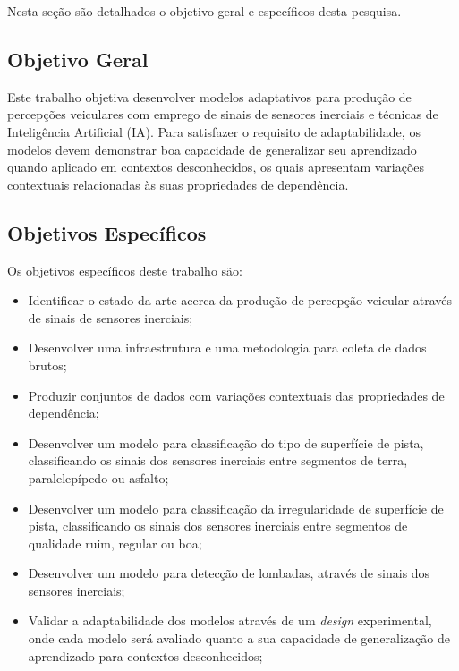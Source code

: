 Nesta seção são detalhados o objetivo geral e específicos desta pesquisa.

\subsection{Objetivo Geral}

Este trabalho objetiva desenvolver modelos adaptativos para produção de percepções veiculares com emprego de sinais de sensores inerciais e técnicas de Inteligência Artificial (IA).  Para satisfazer o requisito de adaptabilidade, os modelos devem demonstrar boa capacidade de generalizar seu aprendizado quando aplicado em contextos desconhecidos, os quais apresentam variações contextuais relacionadas às suas propriedades de dependência.

\subsection{Objetivos Específicos}

Os objetivos específicos deste trabalho são:

\begin{itemize}

\item Identificar o estado da arte acerca da produção de percepção veicular através de sinais de sensores inerciais;

\item Desenvolver uma infraestrutura e uma metodologia para coleta de dados brutos;

\item Produzir conjuntos de dados com variações contextuais das propriedades de dependência;

\item Desenvolver um modelo para classificação do tipo de superfície de pista, classificando os sinais dos sensores inerciais entre segmentos de terra, paralelepípedo ou asfalto;

\item Desenvolver um modelo para classificação da irregularidade de superfície de pista,  classificando os sinais dos sensores inerciais entre segmentos de qualidade ruim, regular ou boa;

\item Desenvolver um modelo para detecção de lombadas, através de sinais dos sensores inerciais;

\item Validar a adaptabilidade dos modelos através de um \textit{design} experimental, onde cada modelo será avaliado quanto a sua capacidade de generalização de aprendizado para contextos desconhecidos;

\end{itemize}

